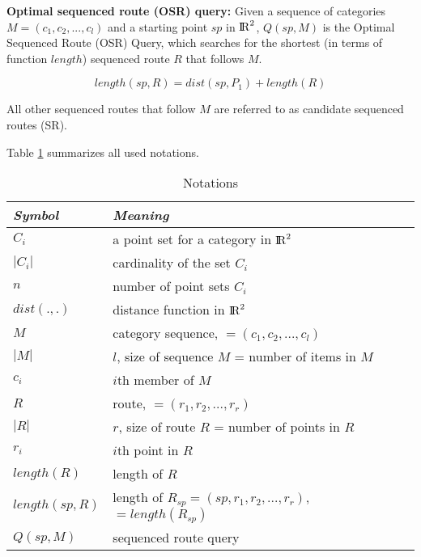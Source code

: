 \textbf{Optimal sequenced route (OSR) query:} Given a sequence of categories $M = (c_1, c_2, ..., c_l)$ and a starting point $sp$ in ${\rm I\!R}^2$, $Q(sp, M)$ is the Optimal Sequenced Route (OSR) Query, which searches for the shortest (in terms of function $length$) sequenced route $R$ that follows $M$.

\begin{equation}
length(sp, R) = dist(sp, P_1) + length(R)
\end{equation}

All other sequenced routes that follow $M$ are referred to as candidate sequenced routes (SR). \newline

Table \ref{table} summarizes all used notations.

\begin{table}[h!]
\centering
	\begin{tabular}{ |l|l| } 
		\hline
		\textit{Symbol} & \textit{Meaning} \\
		\hline
		$C_i$ & a point set for a category in ${\rm I\!R}^2$ \\ 
		\hline
		$|C_i|$ & cardinality of the set $C_i$ \\ 
		\hline
		$n$ & number of point sets $C_i$ \\ 
		\hline
		$dist(., .)$ & distance function in ${\rm I\!R}^2$ \\ 
		\hline
		$M$ & category sequence, $=(c_1, c_2, ..., c_l)$ \\ 
		\hline
		$|M|$ & $l$, size of sequence $M$ = number of items in $M$ \\ 
		\hline
		$c_i$ & $i$th member of $M$ \\ 
		\hline
		$R$ & route, $= (r_1, r_2, ..., r_r)$ \\ 
		\hline
		$|R|$ & $r$, size of route $R$ = number of points in $R$ \\ 
		\hline
		$r_i$ & $i$th point in $R$ \\ 
		\hline
		$length(R)$ & length of $R$ \\ 
		\hline
		$length(sp, R)$ & length of $R_{sp} = (sp, r_1, r_2, ..., r_r)$, $= length(R_{sp})$ \\ 
		\hline
		$Q(sp, M)$ & sequenced route query \\ 
		\hline
	\end{tabular}
\caption{Notations}
\label{table}
\end{table}




